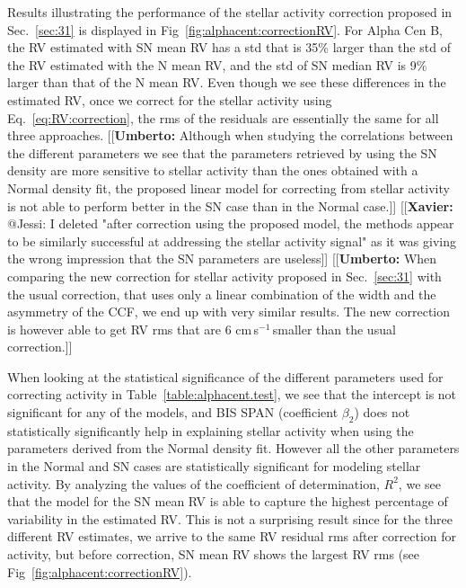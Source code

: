\documentclass{aa}
\def\cms{\hbox{\,cm\,s$^{-1}$}}       %
\newcommand{\xavier}[1]{{\color{blue}[[\textbf{Xavier: }#1]]}}
\newcommand{\umberto}[1]{{\color{green}[[\textbf{Umberto: }#1]]}}
\begin{document}
Results illustrating the performance of the stellar activity correction proposed in Sec.~\ref{sec:31} is displayed in Fig~\ref{fig:alphacent:correctionRV}. 
For Alpha Cen B, the RV estimated with SN mean RV has a std that is 35\% larger than the std of the RV estimated with the N mean RV, and the std of SN median RV is 9\% larger than that of the N mean RV.
Even though we see these differences in the estimated RV, once we correct for the stellar activity using Eq.~\ref{eq:RV:correction}, 
the rms of the residuals are essentially the same for all three approaches.
\umberto{Although when studying the correlations between the different parameters we see that the parameters retrieved by using the SN density are more sensitive to stellar activity than the ones obtained with a Normal density fit,
the proposed linear model for correcting from stellar activity is not able to perform better in the SN case than in the Normal case.}
\xavier{@Jessi: I deleted "after correction using the proposed model, the methods appear to be similarly successful at addressing the stellar activity signal" as it was giving the wrong impression that the SN parameters are useless}
\umberto{When comparing the new correction for stellar activity proposed in Sec.~\ref{sec:31} with the usual correction, that uses only a linear combination of the width and the asymmetry of the CCF, we end up with very similar results. The new correction is however able to get RV rms that are 6\,\cms\,smaller than the usual correction.}


When looking at the statistical significance of the different parameters used for correcting activity in Table~\ref{table:alphacent.test}, we see that the intercept is not significant for any of the models, and BIS SPAN (coefficient $\beta_2$) does not statistically significantly help in explaining stellar activity when using the parameters derived from the Normal density fit. 
However all the other parameters in the Normal and SN cases are statistically significant for modeling stellar activity. 
By analyzing the values of the coefficient of determination, $R^2$, we see that the model for the SN mean RV is able to capture the highest percentage of variability in the estimated RV. 
This is not a surprising result since for the three different RV estimates, we arrive to the same RV residual rms after correction for activity, but before correction, SN mean RV shows the largest RV rms (see Fig~\ref{fig:alphacent:correctionRV}).
\end{document}
